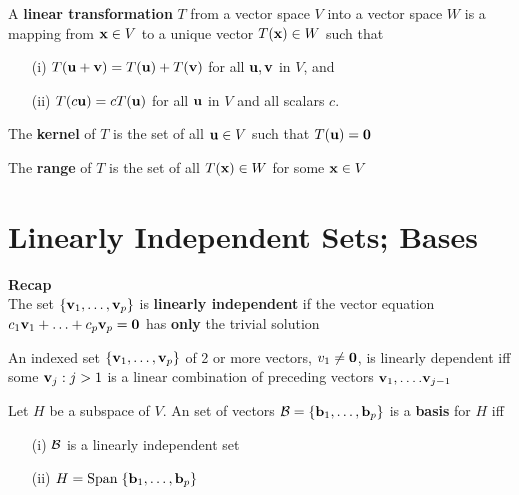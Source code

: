 \documentclass{report}
\begin{document}
\begin{definition}
    A \textbf{linear transformation} $T$ from a vector space $V$ into a vector space
    $W$ is a mapping from $\mathbf{x} \in  V$ to a unique vector $T(\mathbf{x}) \in W$ such that
    \begin{itemize}[]
        \item[(i)] $T(\mathbf{u} + \mathbf{v}) = T(\mathbf{u}) + T(\mathbf{v})$ \quad for all $\mathbf{u}, \mathbf{v}$ in $V$, and
        \item[(ii)] $T(c \mathbf{u}) = c T(\mathbf{u})$ \quad for all $\mathbf{u}$ in $V$ and all scalars $c$.
    \end{itemize}
\end{definition}

\begin{definition}
    The \textbf{kernel} of $T$ is the set of all $\mathbf{u} \in V$ such that $T(\mathbf{u}) = \mathbf{0}$
\end{definition}

\begin{definition}
    The \textbf{range} of $T$ is the set of all $T(\mathbf{x}) \in W$ for some $\mathbf{x} \in V$
\end{definition}

\section{Linearly Independent Sets; Bases}
\textbf{Recap}\\
The set $\{\mathbf{v}_1, \dots, \mathbf{v}_p\}$ is \textbf{linearly independent} if the 
vector equation $c_1 \mathbf{v}_1 + \ldots + c_p \mathbf{v}_p = \mathbf{0} $
has \textbf{only} the trivial solution

\begin{theorem}
    An indexed set $\{\mathbf{v}_1, \dots, \mathbf{v}_p\}$ of 2 or more vectors, $v_1 \ne \mathbf{0}$,
    is linearly dependent iff some $\mathbf{v}_j: j > 1$ is a linear combination of 
    preceding vectors $\mathbf{v}_1, \ldots. \mathbf{v}_{j-1}$
\end{theorem}

\begin{definition}
    Let $H$ be a subspace of $V$.
    An set of vectors $\mathcal{B} = \{\mathbf{b}_1, \dots, \mathbf{b}_p\}$ is a \textbf{basis} for
    $H$ iff
    \begin{enumerate}
        \item[(i)] $\mathcal{B}$ is a linearly independent set
        \item[(ii)] $H = \mathrm{Span}\; \{\mathbf{b}_1, \dots, \mathbf{b}_p\}$
    \end{enumerate}
\end{definition}
\end{document}
